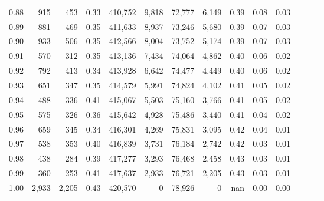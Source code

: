 \begin{tabular}{rrrrrrrrrrrrrr}
0.88 &     915 &    453 &  0.33 &  410,752 &    9,818 &  72,777 &   6,149 &  0.39 &  0.08 &      0.03 \\
0.89 &     881 &    469 &  0.35 &  411,633 &    8,937 &  73,246 &   5,680 &  0.39 &  0.07 &      0.03 \\
0.90 &     933 &    506 &  0.35 &  412,566 &    8,004 &  73,752 &   5,174 &  0.39 &  0.07 &      0.03 \\
0.91 &     570 &    312 &  0.35 &  413,136 &    7,434 &  74,064 &   4,862 &  0.40 &  0.06 &      0.02 \\
0.92 &     792 &    413 &  0.34 &  413,928 &    6,642 &  74,477 &   4,449 &  0.40 &  0.06 &      0.02 \\
0.93 &     651 &    347 &  0.35 &  414,579 &    5,991 &  74,824 &   4,102 &  0.41 &  0.05 &      0.02 \\
0.94 &     488 &    336 &  0.41 &  415,067 &    5,503 &  75,160 &   3,766 &  0.41 &  0.05 &      0.02 \\
0.95 &     575 &    326 &  0.36 &  415,642 &    4,928 &  75,486 &   3,440 &  0.41 &  0.04 &      0.02 \\
0.96 &     659 &    345 &  0.34 &  416,301 &    4,269 &  75,831 &   3,095 &  0.42 &  0.04 &      0.01 \\
0.97 &     538 &    353 &  0.40 &  416,839 &    3,731 &  76,184 &   2,742 &  0.42 &  0.03 &      0.01 \\
0.98 &     438 &    284 &  0.39 &  417,277 &    3,293 &  76,468 &   2,458 &  0.43 &  0.03 &      0.01 \\
0.99 &     360 &    253 &  0.41 &  417,637 &    2,933 &  76,721 &   2,205 &  0.43 &  0.03 &      0.01 \\
1.00 &   2,933 &  2,205 &  0.43 &  420,570 &        0 &  78,926 &       0 &   nan &  0.00 &      0.00 \\
\bottomrule
\end{tabular}
